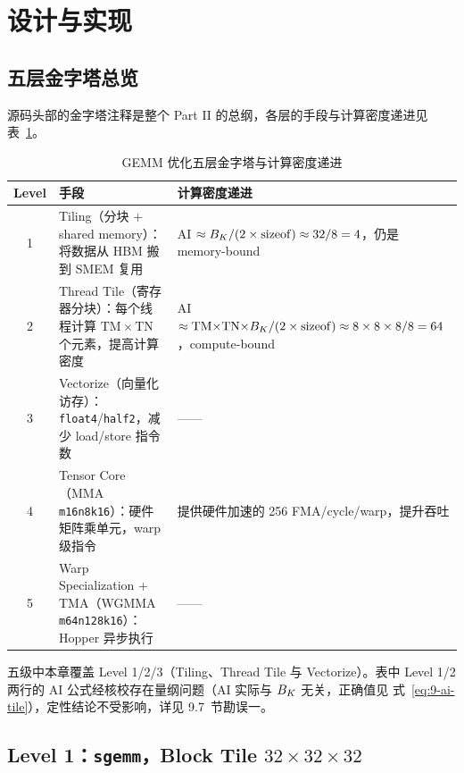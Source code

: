 \section{设计与实现}

\subsection{五层金字塔总览}

源码头部的金字塔注释是整个 Part II 的总纲，各层的手段与计算密度递进见
表~\ref{tab:9-pyramid}。

\begin{table}[htbp]
\centering
\caption{GEMM 优化五层金字塔与计算密度递进}
\label{tab:9-pyramid}
\begin{tabular}{cp{}p{}}
\toprule
Level & 手段 & 计算密度递进 \\
\midrule
1 & Tiling（分块 + shared memory）：将数据从 HBM 搬到 SMEM 复用 &
  AI $\approx B\sb{K}/(2\times\mathrm{sizeof}) \approx 32/8 = 4$，仍是 memory-bound \\
2 & Thread Tile（寄存器分块）：每个线程计算 $\mathrm{TM}\times\mathrm{TN}$ 个元素，提高计算密度 &
  AI $\approx \mathrm{TM}{\times}\mathrm{TN}{\times}B\sb{K}/(2\times\mathrm{sizeof}) \approx 8\times8\times8/8 = 64$，compute-bound \\
3 & Vectorize（向量化访存）：\texttt{float4}/\texttt{half2}，减少 load/store 指令数 & —— \\
4 & Tensor Core（MMA \texttt{m16n8k16}）：硬件矩阵乘单元，warp 级指令 &
  提供硬件加速的 256 FMA/cycle/warp，提升吞吐 \\
5 & Warp Specialization + TMA（WGMMA \texttt{m64n128k16}）：Hopper 异步执行 & —— \\
\bottomrule
\end{tabular}
\end{table}

五级中本章覆盖 Level 1/2/3（Tiling、Thread Tile 与 Vectorize）。表中
Level 1/2 两行的 AI 公式经核校存在量纲问题（AI 实际与 $B\sb{K}$ 无关，正确值见
式~\ref{eq:9-ai-tile}），定性结论不受影响，详见 9.7~节勘误一。

\subsection{Level 1：\texttt{sgemm}，Block Tile $32 \times 32 \times 32$}



